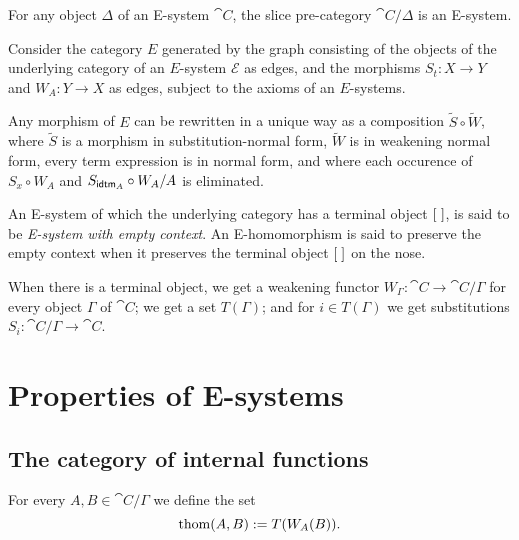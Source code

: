 \begin{cor}
For any object $\Delta$ of an E-system $\cat{C}$, the slice pre-category $\cat{C}/\Delta$
is an E-system.
\end{cor}

\begin{rmk}
Consider the category $E$ generated by the graph consisting of the objects of 
the underlying category of an $E$-system $\mathcal{E}$ as edges, and the morphisms
$S_t:X\to Y$ and $W_A:Y\to X$ as edges, subject to the axioms of an $E$-systems.
 
Any morphism of $E$ can be rewritten in a unique way
as a composition $\tilde S\circ \tilde W$, where $\tilde S$ is a morphism in
substitution-normal form, $\tilde W$ is in weakening normal form, every term
expression is in normal form, and where
each occurence of $S_x\circ W_A$ and $S_{\tfid{A}}\circ W_A/A$ is eliminated.
\end{rmk}

\begin{defn}
An E-system of which the underlying category has a terminal object ${[\;]}$, is said to
be \emph{E-system with empty context}. An E-homomorphism is said to preserve the
empty context when it preserves the terminal object ${[\;]}$ on the nose.
\end{defn}

\begin{rmk}
When there is a terminal object, we get a weakening functor $W_\Gamma:\cat{C}\to
\cat{C}/\Gamma$ for every object $\Gamma$ of $\cat{C}$; we get a set $T(\Gamma)$;
and for $i\in T(\Gamma)$ we get substitutions $S_i:\cat{C}/\Gamma\to\cat{C}$. 
\end{rmk}

\section{Properties of E-systems}

\subsection{The category of internal functions}

\begin{defn}
For every $A,B\in\cat{C}/\Gamma$ we define the set 
\begin{equation*}
\mathrm{thom}(A,B):=T(W_A(B)).
\end{equation*} 
\end{defn}


